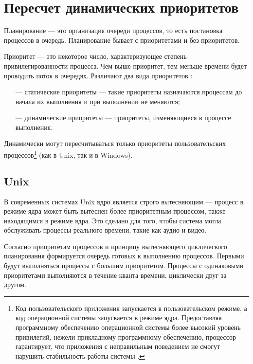 \chapter{Пересчет динамических приоритетов}

Планирование \cite{cospect} --- это организация очереди процессов, то есть постановка процессов в очередь. Планирование бывает с приоритетами и без приоритетов.

Приоритет --- это некоторое число, характеризующее степень привилегированности процесса. Чем выше приоритет, тем меньше времени будет проводить поток в очередях. Различают два вида приоритетов \cite{cospect}:

\begin{itemize}
    \item[---] статические приоритеты --- такие приоритеты назначаются процессам до начала их выполнения и при выполнении не меняются;
    \item[---] динамические приоритеты --- приоритеты, изменяющиеся в процессе выполнения.
\end{itemize}

Динамически могут пересчитываться только приоритеты пользовательских процессов\footnote{Код пользовательского приложения запускается в пользовательском режиме, а код операционной системы запускается в режиме ядра. Предоставляя программному обеспечению операционной системы более высокий уровень привилегий, нежели прикладному программному обеспечению, процессор гарантирует, что приложения с неправильным поведением не смогут нарушить стабильность работы системы \cite{win5}.} (как в Unix, так и в Windows). 


\section{Unix}

В современных системах Unix ядро является строго вытесняющим --- процесс в режиме ядра может быть вытеснен более приоритетным процессом, также находящимся в режиме ядра. Это сделано для того, чтобы система могла обслуживать процессы реального времени, такие как аудио и видео.

Согласно приоритетам процессов и принципу вытесняющего циклического планирования формируется очередь готовых к выполнению процессов. Первыми будут выполняться процессы с большим приоритетом. Процессы с одинаковыми приоритетами выполняются в течение кванта времени, циклически друг за другом.

